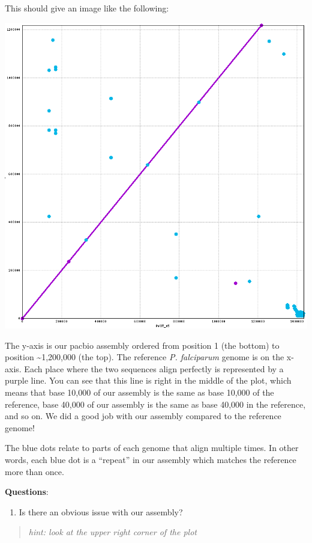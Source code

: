 \documentclass[11pt]{article}
\providecommand{\tightlist}{%
      \setlength{\itemsep}{0pt}\setlength{\parskip}{0pt}}
\begin{document}
    This should give an image like the following:

\includegraphics{images/MUMMER_1.png}

The y-axis is our pacbio assembly ordered from position 1 (the bottom)
to position \textasciitilde1,200,000 (the top). The reference \textit{P.
falciparum} genome is on the x-axis. Each place where the two sequences
align perfectly is represented by a purple line. You can see that this
line is right in the middle of the plot, which means that base 10,000 of
our assembly is the same as base 10,000 of the reference, base 40,000 of
our assembly is the same as base 40,000 in the reference, and so on. We
did a good job with our assembly compared to the reference genome!

The blue dots relate to parts of each genome that align multiple times.
In other words, each blue dot is a ``repeat'' in our assembly which
matches the reference more than once.

\textbf{Questions}:

\begin{enumerate}
\def\labelenumi{\arabic{enumi}.}
\tightlist
\item
  Is there an obvious issue with our assembly?
\end{enumerate}

\begin{quote}
\textit{hint: look at the upper right corner of the plot}
\end{quote}
\end{document}
